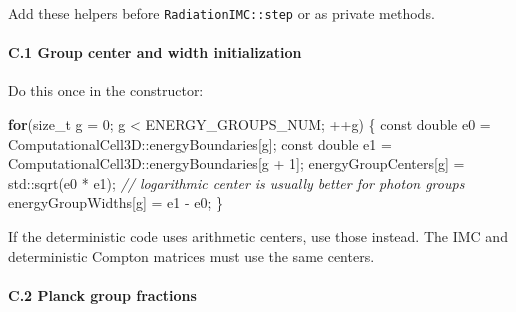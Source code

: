 \documentclass[
]{article}
\newenvironment{Shaded}{}{}
\newcommand{\AttributeTok}[1]{\textcolor[rgb]{0.49,0.56,0.16}{#1}}
\newcommand{\BuiltInTok}[1]{\textcolor[rgb]{0.00,0.50,0.00}{#1}}
\newcommand{\CommentTok}[1]{\textcolor[rgb]{0.38,0.63,0.69}{\textit{#1}}}
\newcommand{\ControlFlowTok}[1]{\textcolor[rgb]{0.00,0.44,0.13}{\textbf{#1}}}
\newcommand{\DataTypeTok}[1]{\textcolor[rgb]{0.56,0.13,0.00}{#1}}
\newcommand{\DecValTok}[1]{\textcolor[rgb]{0.25,0.63,0.44}{#1}}
\newcommand{\NormalTok}[1]{#1}
\newcommand{\OperatorTok}[1]{\textcolor[rgb]{0.40,0.40,0.40}{#1}}
\begin{document}
Add these helpers before \texttt{RadiationIMC::step} or as private
methods.

\paragraph{C.1 Group center and width
initialization}\label{c.1-group-center-and-width-initialization}

Do this once in the constructor:

\begin{Shaded}
\begin{Highlighting}[]
\ControlFlowTok{for}\OperatorTok{(}\DataTypeTok{size\_t}\NormalTok{ g }\OperatorTok{=} \DecValTok{0}\OperatorTok{;}\NormalTok{ g }\OperatorTok{\textless{}}\NormalTok{ ENERGY\_GROUPS\_NUM}\OperatorTok{;} \OperatorTok{++}\NormalTok{g}\OperatorTok{)}
\OperatorTok{\{}
    \AttributeTok{const} \DataTypeTok{double}\NormalTok{ e0 }\OperatorTok{=}\NormalTok{ ComputationalCell3D}\OperatorTok{::}\NormalTok{energyBoundaries}\OperatorTok{[}\NormalTok{g}\OperatorTok{];}
    \AttributeTok{const} \DataTypeTok{double}\NormalTok{ e1 }\OperatorTok{=}\NormalTok{ ComputationalCell3D}\OperatorTok{::}\NormalTok{energyBoundaries}\OperatorTok{[}\NormalTok{g }\OperatorTok{+} \DecValTok{1}\OperatorTok{];}
\NormalTok{    energyGroupCenters}\OperatorTok{[}\NormalTok{g}\OperatorTok{]} \OperatorTok{=} \BuiltInTok{std::}\NormalTok{sqrt}\OperatorTok{(}\NormalTok{e0 }\OperatorTok{*}\NormalTok{ e1}\OperatorTok{);}  \CommentTok{// logarithmic center is usually better for photon groups}
\NormalTok{    energyGroupWidths}\OperatorTok{[}\NormalTok{g}\OperatorTok{]} \OperatorTok{=}\NormalTok{ e1 }\OperatorTok{{-}}\NormalTok{ e0}\OperatorTok{;}
\OperatorTok{\}}
\end{Highlighting}
\end{Shaded}

If the deterministic code uses arithmetic centers, use those instead.
The IMC and deterministic Compton matrices must use the same centers.

\paragraph{C.2 Planck group fractions}\label{c.2-planck-group-fractions}
\end{document}
